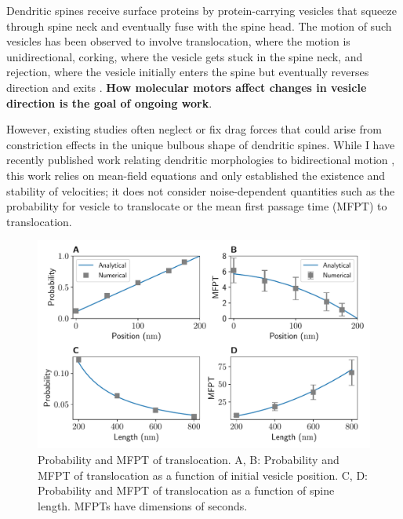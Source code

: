 \documentclass[a4paper,11pt]{article}
\begin{document}
	Dendritic spines receive surface proteins by protein-carrying vesicles that squeeze through spine neck and eventually fuse with the spine head. The motion of such vesicles has been observed to involve translocation, where the motion is unidirectional, corking, where the vesicle gets stuck in the spine neck, and rejection, where the vesicle initially enters the spine but eventually reverses direction and exits \cite{park2006plasticity}. \textbf{How molecular motors affect changes in vesicle direction is the goal of ongoing work}.
	
	However, existing studies often neglect or fix drag forces that could arise from constriction effects in the unique bulbous shape of dendritic spines. While I have recently published work relating dendritic morphologies to bidirectional motion \cite{park2020dynamics}, this work relies on mean-field equations and only established the existence and stability of velocities; it does not consider noise-dependent quantities such as the probability for vesicle to translocate or the mean first passage time (MFPT) to translocation.
    
    \begin{figure}[ht!]
        \centering
        \includegraphics[width=\textwidth]{figures/f_mfpt_translocation.pdf}
        \caption{Probability and MFPT of translocation. A, B: Probability and MFPT of translocation as a function of initial vesicle position. C, D: Probability and MFPT of translocation as a function of spine length. MFPTs have dimensions of seconds.}\label{fig:mfpt}
    \end{figure}
    
\end{document}
